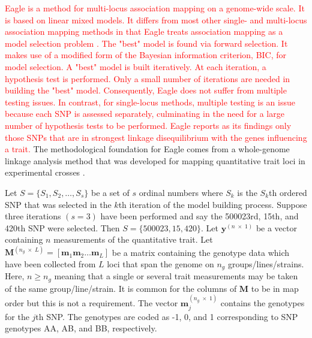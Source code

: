 \documentclass{bioinfo}
\newcommand{\by}{\bm{y}}
\newcommand{\bM}{\bm{M}}
\newcommand{\bmm}{\bm{m}}
\begin{document}
\textcolor{red}{
Eagle is a method for multi-locus association mapping on a genome-wide scale. It is based on linear mixed models. It differs from most other single- and multi-locus association mapping methods in that Eagle treats association mapping as a model selection problem \citep{ball2001bayesian,broman2002model,yi2005bayesian}. 
The "best" model is found via forward selection. It makes use of a modified form of the Bayesian information criterion, BIC, for model selection.
A "best" model is built iteratively. At each iteration, a hypothesis test is performed. 
Only a small number of iterations are needed in building the "best" model.  Consequently, 
Eagle does not suffer from multiple testing issues.
In contrast,  for single-locus methods, multiple testing is an 
issue because each SNP is assessed separately, culminating in the need for a large number of hypothesis tests to be  performed. 
Eagle 
reports as its findings only those SNPs that are in strongest linkage disequilibrium with  the genes influencing a trait. }
The methodological foundation for Eagle comes from a whole-genome linkage analysis method that was developed for mapping 
quantitative trait loci in experimental crosses \citep{verbyla2007analysis}.


Let $S = \{ S_1, S_2, \ldots, S_s\}$ be a set of $s$ ordinal numbers where $S_k$ is the $S_k$th ordered SNP that was 
selected in the $k$th iteration of the model building process. Suppose three iterations  $(s=3)$
have been performed and say the 500023rd, 15th, and 420th
SNP were selected. Then $S=\{500023, 15, 420\}$. 
Let $\by^{(n \; \times \;1)}$ be a vector containing $n$ measurements of the quantitative trait. 
Let $\bM^{(n_g \; \times \; L)} = [\bmm_1 \bmm_2 \ldots \bmm_L]$ be a matrix containing the genotype data which have been collected 
from $L$ loci that span the genome on $n_g$ groups/lines/strains.  Here, $n \geq n_g$ meaning that a single or several trait measurements 
may be taken of the same group/line/strain. 
 It is common for the columns of $\bM$ to be in map order but this is not a requirement. 
The vector $\bmm_j^{(n_g \; \times \; 1)}$ contains the genotypes for the $j$th SNP. 
The genotypes are coded as -1, 0, and 1 corresponding to SNP genotypes AA, AB, and BB, respectively. 
\end{document}
